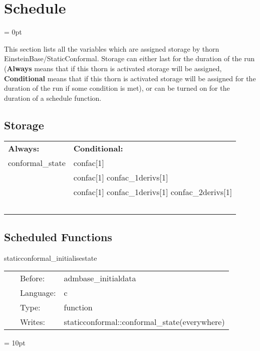 
\section{Schedule} 


\parskip = 0pt


\noindent This section lists all the variables which are assigned storage by thorn EinsteinBase/StaticConformal.  Storage can either last for the duration of the run ({\bf Always} means that if this thorn is activated storage will be assigned, {\bf Conditional} means that if this thorn is activated storage will be assigned for the duration of the run if some condition is met), or can be turned on for the duration of a schedule function.


\subsection*{Storage}

\hspace{5mm}

 \begin{tabular*}{160mm}{ll} 

{\bf Always:}& {\bf Conditional:} \\ 
 conformal\_state &  confac[1]\\ 
~ &  confac[1] confac\_1derivs[1]\\ 
~ &  confac[1] confac\_1derivs[1] confac\_2derivs[1]\\ 
~ & ~\\ 
\end{tabular*} 


\subsection*{Scheduled Functions}
\vspace{5mm}


\hspace{5mm} staticconformal\_initialisestate 

\hspace{5mm}{\it set the conformal\_state variable to 0 } 


\hspace{5mm}

 \begin{tabular*}{160mm}{cll} 
~ & Before:  & admbase\_initialdata \\ 
~ & Language:  & c \\ 
~ & Type:  & function \\ 
~ & Writes:  & staticconformal::conformal\_state(everywhere) \\ 
\end{tabular*} 



\vspace{5mm}\parskip = 10pt 
